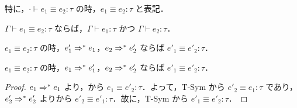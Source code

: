 特に，$\cdot \vdash e_1 \equiv e_2: \tau$ の時，$e_1 \equiv e_2: \tau$ と表記．

\begin{theorem}
  $\Gamma \vdash e_1 \equiv e_2: \tau$ ならば，$\Gamma \vdash e_1: \tau$ かつ $\Gamma \vdash e_2: \tau$．
\end{theorem}

\begin{theorem}
  $e_1 \equiv e_2: \tau$ の時，$e'_1 \Rightarrow^* e_1$，$e_2 \Rightarrow^* e'_2$ ならば $e'_1 \equiv e'_2: \tau$．
\end{theorem}

\begin{corollary}
  $e_1 \equiv e_2: \tau$ の時，$e_1 \Rightarrow^* e'_1$，$e_2 \Rightarrow^* e'_2$ ならば $e'_1 \equiv e'_2: \tau$．
\end{corollary}
\begin{proof}
  $e_1 \Rightarrow^* e_1$ より，から $e_1 \equiv e'_2: \tau$．よって，T-Sym から $e'_2 \equiv e_1: \tau$ であり，$e'_2 \Rightarrow^* e'_2$ よりから $e'_2 \equiv e'_1: \tau$．故に，T-Sym から $e'_1 \equiv e'_2: \tau$．
\end{proof}
